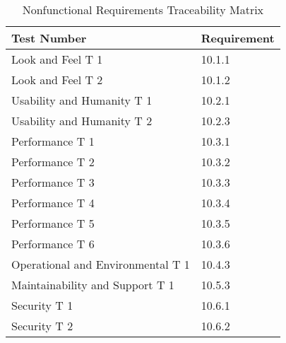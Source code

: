 \documentclass[12pt, titlepage]{article}
\begin{document}
\begin{table}[H]
	\caption{Nonfunctional Requirements Traceability Matrix} \label{TraceMatrix2}
	\begin{tabular}{ll}
		\toprule
		\textbf{Test Number} & \textbf{Requirement} \\
		\midrule
		Look and Feel T 1 & 10.1.1\\
		Look and Feel T 2 & 10.1.2\\
		\midrule
		Usability and Humanity T 1 & 10.2.1\\
		Usability and Humanity T 2 & 10.2.3\\
		\midrule
		Performance T 1 & 10.3.1\\
		Performance T 2 & 10.3.2\\
		Performance T 3 & 10.3.3\\
		Performance T 4 & 10.3.4\\
		Performance T 5 & 10.3.5\\
		Performance T 6 & 10.3.6\\
		\midrule
		Operational and Environmental T 1 & 10.4.3\\
		\midrule
		Maintainability and Support T 1 & 10.5.3\\
		\midrule
		Security T 1 & 10.6.1\\
		Security T 2 & 10.6.2\\
		\bottomrule
	\end{tabular}
\end{table}




\end{document}
